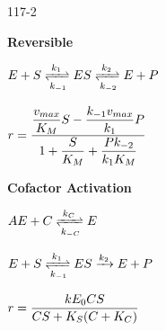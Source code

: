 \begin{mitframe}{117-2}
        
\begin{listone}
	\item \textbf{Reversible}
    
    \begin{listtwo}
    	\item $\energy+\entropy\xrightleftharpoons[\thermcond_{-1}]{\thermcond_1}\energy\entropy\xrightleftharpoons[\thermcond_{-2}]{\thermcond_2}\energy+\p$

		\item $\pos=\dfrac{\dfrac{\vvel_{max}}{\dilfac_M}\entropy-\dfrac{\thermcond_{-1}\vvel_{max}}{\thermcond_1}\p}{1+\dfrac{\entropy}{\dilfac_M}+\dfrac{\p\thermcond_{-2}}{\thermcond_1\dilfac_M}}$	
	\end{listtwo}        
        
	\item \textbf{Cofactor Activation}
	
    \begin{listtwo}
		\item $\helmholtz\energy+\conc\xrightleftharpoons[\thermcond_{-\conc}]{\thermcond_{\conc}}\energy$
        
        \item $\energy+\entropy\xrightleftharpoons[\thermcond_{-1}]{\thermcond_1}\energy\entropy\xrightarrow{\thermcond_2}\energy+\p$

		\item $\pos=\dfrac{\thermcond\energy_{\init}\conc\entropy}{\conc\entropy+\dilfac_{\entropy}(\conc+\dilfac_{\conc})}$	
	\end{listtwo}

\end{listone}
\end{mitframe}